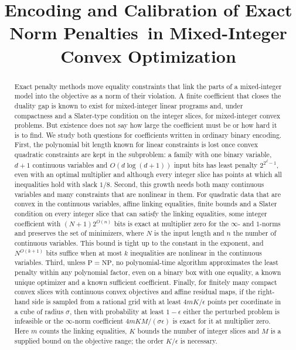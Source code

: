 \documentclass[11pt]{article}
\title{Encoding and Calibration of Exact Norm Penalties\allowbreak\ in Mixed-Integer Convex Optimization}
\author{}
\date{}
\theoremstyle{definition}
\theoremstyle{remark}
\begin{document}
\maketitle
\begin{abstract}
Exact penalty methods move equality constraints that link the parts of a
mixed-integer model into the objective as a norm of their violation. A
finite coefficient that closes the duality gap is known to exist for
mixed-integer linear programs and, under compactness and a Slater-type
condition on the integer slices, for mixed-integer convex problems. But
existence does not say how large the coefficient must be or how hard it
is to find. We study both questions for coefficients written in ordinary
binary encoding. First, the polynomial bit length known for linear
constraints is lost once convex quadratic constraints are kept in the
subproblem: a family with one binary variable, $d+1$ continuous
variables and $O(d\log(d+1))$ input bits has least penalty $2^{2^d-1}$,
even with an optimal multiplier and although every integer slice has
points at which all inequalities hold with slack $1/8$. Second, this
growth needs both many continuous variables and many constraints that
are nonlinear in them. For quadratic data that are convex in the
continuous variables, affine linking equalities, finite bounds and a
Slater condition on every integer slice that can satisfy the linking
equalities, some integer
coefficient with $(N+1)2^{O(n)}$ bits is exact at multiplier zero for the
$\infty$- and $1$-norms and preserves the set of minimizers, where $N$ is
the input length and $n$ the number of continuous variables. This bound
is tight up to the constant in the exponent, and $N^{O(k+1)}$ bits
suffice when at most $k$ inequalities are nonlinear in the continuous
variables. Third, unless $\mathrm P=\mathrm{NP}$, no polynomial-time
algorithm approximates the least penalty within any polynomial factor,
even on a binary box with one equality, a known unique optimizer and a
known sufficient coefficient. Finally, for finitely many compact convex
slices with continuous convex objectives and affine residual maps, if the
right-hand side is sampled from a rational grid with at
least $4mK/\epsilon$ points per coordinate in a cube of radius $\sigma$,
then with probability at least $1-\epsilon$ either the perturbed problem
is infeasible or the $\infty$-norm coefficient $4mKM/(\sigma\epsilon)$ is
exact for it at multiplier zero. Here $m$ counts the linking equalities,
$K$ bounds the number of integer slices and $M$ is a supplied bound on
the objective range; the order $K/\epsilon$ is necessary.
\end{abstract}










\appendix


\end{document}

